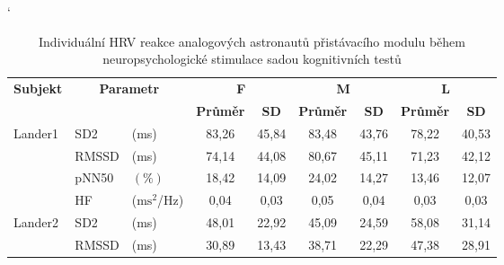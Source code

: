 \begin{table}[h]
    \catcode`
    \footnotesize
    \centering
    \caption{Individuální HRV reakce analogových astronautů přistávacího modulu během neuropsychologické stimulace sadou kognitivních testů}
    \begin{threeparttable}
        \begin{tabular*}{\linewidth}{@{\extracolsep{\fill}} lllcccccc @{}}
            \toprule
            \textbf{Subjekt}            & \multicolumn{2}{c}{\textbf{Parametr}} & \multicolumn{2}{c}{\textbf{F}} & \multicolumn{2}{c}{\textbf{M}} & \multicolumn{2}{c}{\textbf{L}}                                                                 \\ \cmidrule(rl){4-5} \cmidrule(rl){6-7} \cmidrule(rl){8-9}
            &                                       &                                & \textbf{Průměr}                & \textbf{SD}                    & \textbf{Průměr} & \textbf{SD} & \textbf{Průměr} & \textbf{SD} \\ \midrule
            \multirow[t]{4}{*}{Lander1} & SD2                                  & (ms)                           & 83,26                          & 45,84                          & 83,48           & 43,76       & 78,22           & 40,53       \\
            & RMSSD                                 & (ms)                           & 74,14                          & 44,08                          & 80,67           & 45,11       & 71,23           & 42,12       \\
            & pNN50                                 & $(\%)$                         & 18,42                          & 14,09                          & 24,02           & 14,27       & 13,46           & 12,07       \\
            & HF                                    & ($\text{ms}^2$/Hz)             & 0,04                           & 0,03                           & 0,05            & 0,04        & 0,03            & 0,03        \\ \midrule
            \multirow[t]{4}{*}{Lander2} & SD2                                  & (ms)                           & 48,01                          & 22,92                          & 45,09           & 24,59       & 58,08           & 31,14       \\
            & RMSSD                                 & (ms)                           & 30,89                          & 13,43                          & 38,71           & 22,29       & 47,38           & 28,91        \\

\end{tabular*}
\end{threeparttable}
\end{table}
